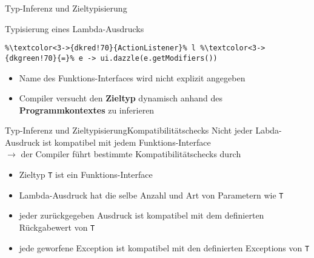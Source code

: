 \begin{frame}[fragile]{Typ-Inferenz und Zieltypisierung}

    \begin{center}
        \begin{minipage}[b]{0.75\textwidth}
            \begin{block}{Typisierung eines Lambda-Ausdrucks \citep{goetz13}}
                    \begin{lstlisting}
%\textcolor<3->{dkred!70}{ActionListener}% l %\textcolor<3->{dkgreen!70}{=}% e -> ui.dazzle(e.getModifiers())
                    \end{lstlisting}
            \end{block}
        \end{minipage}
    \end{center}

    
    \begin{itemize}
        \item<2-> Name des Funktions-Interfaces wird nicht explizit angegeben
        \item<3-> Compiler versucht den \textcolor{dkred!70}{\textbf{Zieltyp}} dynamisch anhand des 
        \textcolor{dkgreen!70}{\textbf{Programmkontextes}} zu inferieren
    \end{itemize}
\end{frame}


\begin{frame}[fragile]{Typ-Inferenz und Zieltypisierung}{Kompatibilitätschecks}
    Nicht jeder Labda-Ausdruck ist kompatibel mit jedem Funktions-Interface\\
    $\rightarrow$ der Compiler führt bestimmte Kompatibilitätschecks durch
    \begin{itemize}
        \item<2-> Zieltyp \texttt{T} ist ein Funktions-Interface
        \item<3-> Lambda-Ausdruck hat die selbe Anzahl und Art von Parametern wie \texttt{T}
        \item<4-> jeder zurückgegeben Ausdruck ist kompatibel mit dem definierten Rückgabewert von \texttt{T}
        \item<5-> jede geworfene Exception ist kompatibel mit den definierten Exceptions von \texttt{T}
    \end{itemize}
\end{frame}



